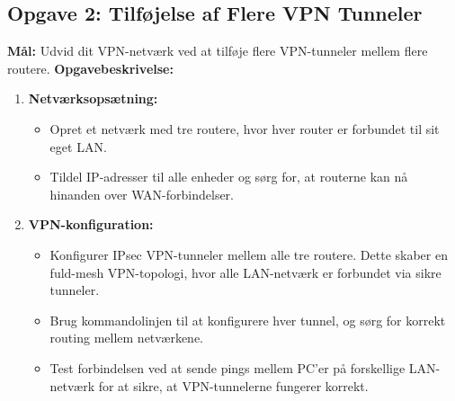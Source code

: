 \subsection*{Opgave 2: Tilføjelse af Flere VPN Tunneler}
\textbf{Mål:} Udvid dit VPN-netværk ved at tilføje flere VPN-tunneler mellem flere routere.
\newline\newline\noindent
\textbf{Opgavebeskrivelse:}
\begin{enumerate}
	\item \textbf{Netværksopsætning:}
	\begin{itemize}
		\item Opret et netværk med tre routere, hvor hver router er forbundet til sit eget LAN.
		\item Tildel IP-adresser til alle enheder og sørg for, at routerne kan nå hinanden over WAN-forbindelser.
	\end{itemize}
	
	\item \textbf{VPN-konfiguration:}
	\begin{itemize}
		\item Konfigurer IPsec VPN-tunneler mellem alle tre routere. Dette skaber en fuld-mesh VPN-topologi, hvor alle LAN-netværk er forbundet via sikre tunneler.
		\item Brug kommandolinjen til at konfigurere hver tunnel, og sørg for korrekt routing mellem netværkene.
		\item Test forbindelsen ved at sende pings mellem PC'er på forskellige LAN-netværk for at sikre, at VPN-tunnelerne fungerer korrekt.
	\end{itemize}
\end{enumerate}

